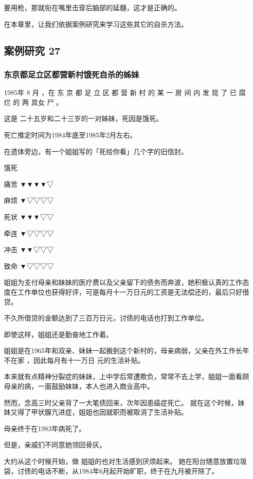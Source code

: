 \documentclass[UTF8]{ctexart}
\begin{document}
要用枪，那就衔在嘴里击穿后脑部的延髓，这才是正确的。

在本章里，让我们依据案例研究来学习这些其它的自杀方法。



\subsection{案例研究 27}

\subsubsection*{东京都足立区都营新村饿死自杀的姊妹}

1985年 8 月 ，在 东 京 都 足 立 区 都 营 新 村 的 某 一 房 间 内 发 现 了 已 腐 烂 的 两 具女 尸 。

这是 二十五岁和二十三岁的一对姊妹，死因是饿死。

死亡推定时间为1984年底至1985年2月左右。

在遗体旁边，有一个姐姐写的「死给你看」几个字的旧信封。

饿死

痛苦 ▼▼▼▼▽

麻烦 ▼▽▽▽▽

死状 ▼▼▼▽▽

牵连 ▼▽▽▽▽

冲击 ▼▼▽▽▽

致命 ▼▽▽▽▽

姐姐为支付母亲和妹妹的医疗费以及父亲留下的债务而奔波，她积极认真的工作态度在工作单位也获得好评，可是每月十一万日元的工资是无法偿还的，最后只好借贷。

不久所借贷的金额达到了三百万日元，讨债的电话也打到工作单位。

即使这样，姐姐还是勤奋地工作着。

姐姐是在1965年和双亲、妹妹一起搬到这个新村的，母亲病弱，父亲在外工作长年不在家 ，因此每月有十一万日 元的生活补贴。

本来就有点精神分裂症的妹妹，上中学后常遭欺负，常常不去上学，姐姐一面看顾母亲的病，一面鼓励妹妹，本人也进入商业高中。

然而，念高三时父亲背了一大笔债回来，次年因患癌症死亡。
就在这个时候，妹妹又得了甲状腺亢进症，姐姐也因就职而被取消了生活补贴。 

母亲终于在1983年病死了。

但是，亲戚们不同意她领回骨灰。

大约从这个时候开始，做 姐姐的也对生活感到厌烦起来。
她在阳台随意放置垃圾袋，讨债的电话不断，从1984年6月起开始旷职，终于在九月被开除了。
\end{document}
